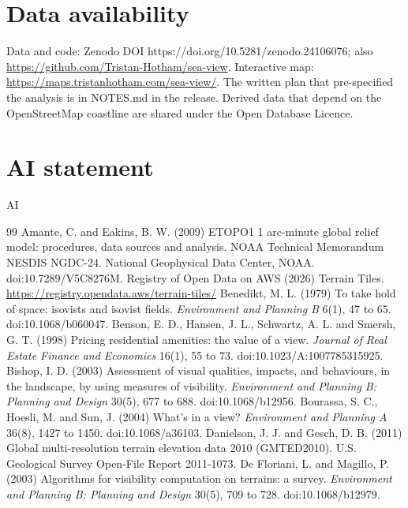 \section*{Data availability}
Data and code: Zenodo DOI https://doi.org/10.5281/zenodo.24106076; also \url{https://github.com/Tristan-Hotham/sea-view}. Interactive map: \url{https://maps.tristanhotham.com/sea-view/}. The written plan that pre-specified the analysis is in NOTES.md in the release. Derived data that depend on the OpenStreetMap coastline are shared under the Open Database Licence.

\section*{AI statement}
{{AI}}


\begin{thebibliography}{99}\small
{} Amante, C. and Eakins, B. W. (2009) ETOPO1 1 arc-minute global relief model: procedures, data sources and analysis. NOAA Technical Memorandum NESDIS NGDC-24. National Geophysical Data Center, NOAA. doi:10.7289/V5C8276M.
 Registry of Open Data on AWS (2026) Terrain Tiles. \url{https://registry.opendata.aws/terrain-tiles/}
 Benedikt, M. L. (1979) To take hold of space: isovists and isovist fields. \textit{Environment and Planning B} 6(1), 47 to 65. doi:10.1068/b060047.
 Benson, E. D., Hansen, J. L., Schwartz, A. L. and Smersh, G. T. (1998) Pricing residential amenities: the value of a view. \textit{Journal of Real Estate Finance and Economics} 16(1), 55 to 73. doi:10.1023/A:1007785315925.
 Bishop, I. D. (2003) Assessment of visual qualities, impacts, and behaviours, in the landscape, by using measures of visibility. \textit{Environment and Planning B: Planning and Design} 30(5), 677 to 688. doi:10.1068/b12956.
 Bourassa, S. C., Hoesli, M. and Sun, J. (2004) What's in a view? \textit{Environment and Planning A} 36(8), 1427 to 1450. doi:10.1068/a36103.
 Danielson, J. J. and Gesch, D. B. (2011) Global multi-resolution terrain elevation data 2010 (GMTED2010). U.S. Geological Survey Open-File Report 2011-1073.
 De Floriani, L. and Magillo, P. (2003) Algorithms for visibility computation on terrains: a survey. \textit{Environment and Planning B: Planning and Design} 30(5), 709 to 728. doi:10.1068/b12979.

\end{thebibliography}
